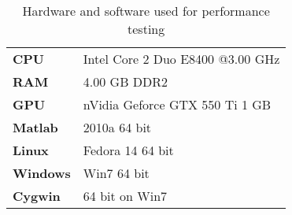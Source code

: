 \begin{table}[H]
\begin{center}
\vspace{0.3cm}
\SingleSpacing
	\begin{tabular}{ll}
	\hline \hline
		\textbf{CPU} \rule{0pt}{2.6ex}& Intel Core 2 Duo E8400 @3.00 GHz\\
		\textbf{RAM} & 4.00 GB DDR2\\
		\textbf{GPU} & nVidia Geforce GTX 550 Ti 1 GB\\
		\textbf{Matlab} & 2010a 64 bit\\
		\textbf{Linux} & Fedora 14 64 bit\\
		\textbf{Windows} & Win7 64 bit\\
		\textbf{Cygwin} & 64 bit on Win7\\
	\hline \hline
	\end{tabular}
\end{center}
\caption{Hardware and software used for performance testing}
\label{Tab:Hardware-Software-Configuration-for-Testing}
\end{table}
